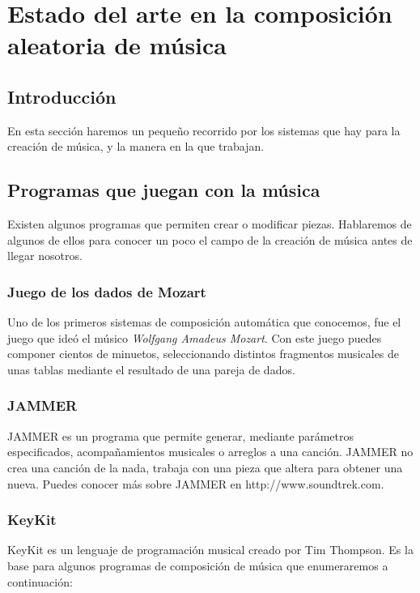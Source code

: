 \chapter{Estado del arte en la composici\'on aleatoria de m\'usica}
\section{Introducci\'on}

En esta secci\'on haremos un peque\~no recorrido por los sistemas que hay para la creaci\'on de m\'usica, y la manera en la que trabajan.

\section{Programas que juegan con la m\'usica}

Existen algunos programas que permiten crear o modificar  piezas. Hablaremos de algunos de ellos para conocer un poco el campo de la creaci\'on de m\'usica antes de llegar nosotros.

\subsection{Juego de los dados de Mozart}

Uno de los primeros sistemas de composici\'on autom\'atica que conocemos, fue el juego que ide\'o el m\'usico \emph{Wolfgang Amadeus Mozart}. Con este juego puedes componer cientos de minuetos, seleccionando distintos fragmentos musicales de unas tablas mediante el resultado de una pareja de dados.

\subsection{JAMMER}

JAMMER es un programa que permite generar, mediante par\'ametros especificados, acompa\~namientos musicales o arreglos a una canci\'on. JAMMER no crea una canci\'on de la nada, trabaja con una pieza que altera para obtener una nueva.
Puedes conocer m\'as sobre JAMMER en http://www.soundtrek.com.

\subsection {KeyKit}

KeyKit es un lenguaje de programaci\'on musical creado por Tim Thompson. Es la base para algunos programas de composici\'on de m\'usica que enumeraremos a continuaci\'on:

